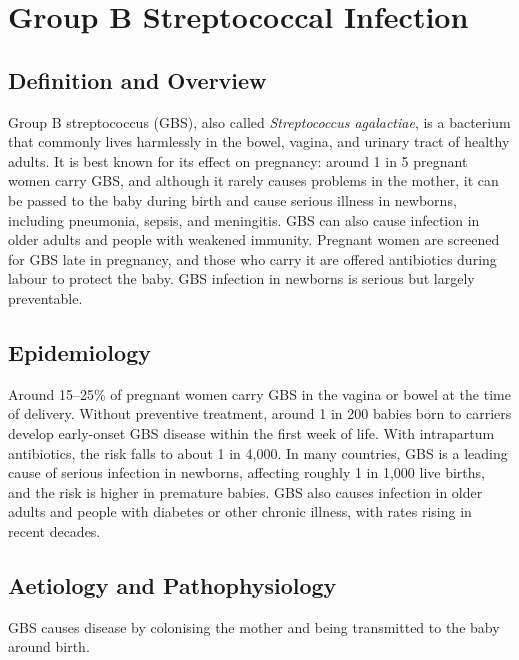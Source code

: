\chapter{Group B Streptococcal Infection}

\section*{Definition and Overview}
Group B streptococcus (GBS), also called \textit{Streptococcus agalactiae}, is a bacterium that commonly lives harmlessly in the bowel, vagina, and urinary tract of healthy adults. It is best known for its effect on pregnancy: around 1 in 5 pregnant women carry GBS, and although it rarely causes problems in the mother, it can be passed to the baby during birth and cause serious illness in newborns, including pneumonia, sepsis, and meningitis. GBS can also cause infection in older adults and people with weakened immunity. Pregnant women are screened for GBS late in pregnancy, and those who carry it are offered antibiotics during labour to protect the baby. GBS infection in newborns is serious but largely preventable.

\section*{Epidemiology}
Around 15--25\% of pregnant women carry GBS in the vagina or bowel at the time of delivery. Without preventive treatment, around 1 in 200 babies born to carriers develop early-onset GBS disease within the first week of life. With intrapartum antibiotics, the risk falls to about 1 in 4,000. In many countries, GBS is a leading cause of serious infection in newborns, affecting roughly 1 in 1,000 live births, and the risk is higher in premature babies. GBS also causes infection in older adults and people with diabetes or other chronic illness, with rates rising in recent decades.

\section*{Aetiology and Pathophysiology}
GBS causes disease by colonising the mother and being transmitted to the baby around birth.

